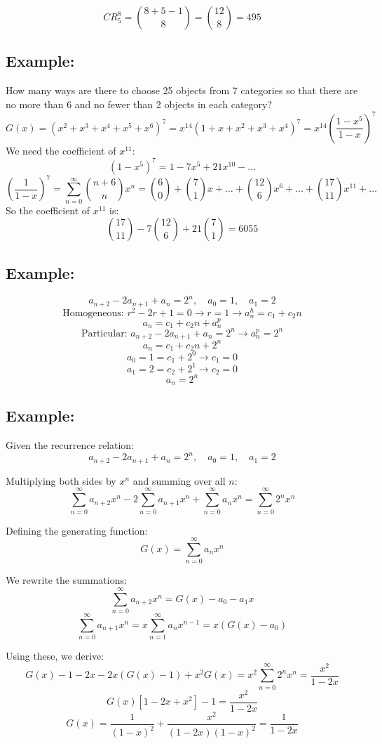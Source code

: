 \documentclass[11pt]{article}
\begin{document}
\[
CR_5^8 = \binom{8 + 5 - 1}{8} = \binom{12}{8} = 495
\]

\subsection*{Example:}
How many ways are there to choose 25 objects from 7 categories so that there are no more than 6 and no fewer than 2 objects in each category?
\[
G(x) = (x^2 + x^3 + x^4 + x^5 + x^6)^7 = x^{14} (1 + x + x^2 + x^3 + x^4)^7 = x^{14} \left( \frac{1 - x^5}{1 - x} \right)^7
\]
We need the coefficient of $x^{11}$:
\[
(1 - x^5)^7 = 1 - 7x^5 + 21x^{10} - \dots
\]
\[
\left(\frac{1}{1 - x}\right)^7 = \sum_{n = 0}^{\infty} \binom{n + 6}{n} x^n = \binom{6}{0} + \binom{7}{1}x + \dots + \binom{12}{6}x^6 + \dots + \binom{17}{11}x^{11} + \dots
\]
So the coefficient of $x^{11}$ is:
\[
\binom{17}{11} - 7 \binom{12}{6} + 21 \binom{7}{1} = 6055
\]

\subsection*{Example:}
\[
a_{n + 2} - 2a_{n + 1} + a_n = 2^n, \quad a_0 = 1, \quad a_1 = 2
\]
\[
\text{Homogeneous: } r^2 - 2r + 1 = 0 \rightarrow r = 1 \rightarrow a_n^h = c_1 + c_2 n
\]
\[
a_n = c_1 + c_2 n + a_n^p
\]
\[
\text{Particular: } a_{n + 2} - 2a_{n + 1} + a_n = 2^n \rightarrow a_n^p = 2^n
\]
\[
a_n = c_1 + c_2 n + 2^n
\]
\[
a_0 = 1 = c_1 + 2^0 \rightarrow c_1 = 0
\]
\[
a_1 = 2 = c_2 + 2^1 \rightarrow c_2 = 0
\]
\[
a_n = 2^n
\]

\subsection*{Example:}
Given the recurrence relation:
\[
a_{n+2} - 2a_{n+1} + a_n = 2^n, \quad a_0 = 1, \quad a_1 = 2
\]

Multiplying both sides by \( x^n \) and summing over all \( n \):
\[
\sum_{n=0}^{\infty} a_{n+2} x^n - 2 \sum_{n=0}^{\infty} a_{n+1} x^n + \sum_{n=0}^{\infty} a_n x^n = \sum_{n=0}^{\infty} 2^n x^n
\]

Defining the generating function:
\[
G(x) = \sum_{n=0}^{\infty} a_n x^n
\]

We rewrite the summations:
\[
\sum_{n=0}^{\infty} a_{n+2} x^n = G(x) - a_0 - a_1 x
\]
\[
\sum_{n=0}^{\infty} a_{n+1} x^n = x \sum_{n=1}^{\infty} a_n x^{n-1} = x(G(x) - a_0)
\]

Using these, we derive:
\[
G(x) - 1 - 2x - 2x(G(x) - 1) + x^2 G(x) = x^2 \sum_{n=0}^{\infty} 2^n x^n = \frac{x^2}{1-2x}
\]
\[
G(x) \left[1 - 2x + x^2 \right] - 1 = \frac{x^2}{1-2x}
\]
\[
G(x) = \frac{1}{(1-x)^2} + \frac{x^2}{(1-2x)(1-x)^2} = \frac{1}{1-2x}
\]
\end{document}
